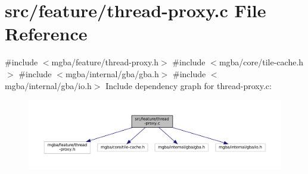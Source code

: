 \hypertarget{thread-proxy_8c}{}\section{src/feature/thread-\/proxy.c File Reference}
\label{thread-proxy_8c}
{\ttfamily \#include $<$mgba/feature/thread-\/proxy.\+h$>$}\newline
{\ttfamily \#include $<$mgba/core/tile-\/cache.\+h$>$}\newline
{\ttfamily \#include $<$mgba/internal/gba/gba.\+h$>$}\newline
{\ttfamily \#include $<$mgba/internal/gba/io.\+h$>$}\newline
Include dependency graph for thread-\/proxy.c\+:
\nopagebreak
\begin{figure}[H]
\begin{center}
\leavevmode
\includegraphics[width=350pt]{thread-proxy_8c__incl}
\end{center}
\end{figure}
